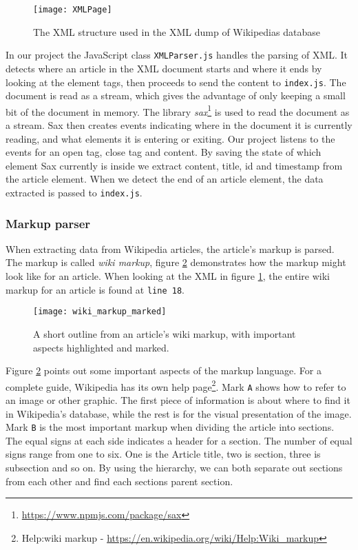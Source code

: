 \begin{figure}[h]
\caption{The XML structure used in the XML dump of Wikipedias database}
\texttt{[image: XMLPage]}
\label{fig:xml}
\end{figure}

In our project the JavaScript class \texttt{XMLParser.js} handles the parsing of XML. It detects where an article in the XML document starts and where it ends by looking at the element tags, then proceeds to send the content to \texttt{index.js}. The document is read as a stream, which gives the advantage of only keeping a small bit of the document in memory. The library \textit{sax}\footnote{\url{https://www.npmjs.com/package/sax}} is used to read the document as a stream. Sax then creates events indicating where in the document it is currently reading, and what elements it is entering or exiting. Our project listens to the events for an open tag, close tag and content. By saving the state of which element Sax currently is inside we extract content, title, id and timestamp from the article element. When we detect the end of an article element, the data extracted is passed to \texttt{index.js}.

\subsubsection{Markup parser}



When extracting data from Wikipedia articles, the article's markup is parsed. The markup is called \textit{wiki markup}, figure \ref{fig:wiki_markup} demonstrates how the markup might look like for an article. When looking at the XML in figure \ref{fig:xml}, the entire wiki markup for an article is found at \texttt{line 18}.

\begin{figure}[h]
\caption{A short outline from an article's wiki markup, with important aspects highlighted and marked. }
\texttt{[image: wiki\_markup\_marked]}
\label{fig:wiki_markup}
\end{figure}

Figure \ref{fig:wiki_markup} points out some important aspects of the markup language. For a complete guide, Wikipedia has its own help page\footnote{Help:wiki markup - \url{https://en.wikipedia.org/wiki/Help:Wiki_markup}}. Mark \texttt{A} shows how to refer to an image or other graphic. The first piece of information is about where to find it in Wikipedia's database, while the rest is for the visual presentation of the image. Mark \texttt{B} is the most important markup when dividing the article into sections. The equal signs at each side indicates a header for a section. The number of equal signs range from one to six. One is the Article title, two is section, three is subsection and so on. By using the hierarchy, we can both separate out sections from each other and find each sections parent section.

